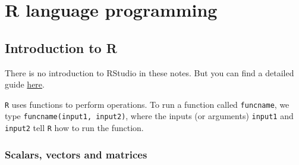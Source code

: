 \documentclass[a4paper]{article}
\newcommand{\highspace}{\vspace{1.2em}\noindent}
\begin{document}

    \newpage

    \section{R language programming}

    \subsection{Introduction to R}

    There is no introduction to RStudio in these notes. But you can find a detailed guide \href{https://moderndive.netlify.app/1-getting-started#getting-started}{here}.

    \highspace
    \texttt{R} uses functions to perform operations. To run a function called \texttt{funcname}, we type \texttt{funcname(input1, input2)}, where the inputs (or arguments) \texttt{input1} and \texttt{input2} tell \texttt{R} how to run the function.

    \newpage

    \subsubsection{Scalars, vectors and matrices}
\end{document}
